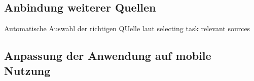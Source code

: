 \subsection{Anbindung weiterer Quellen}
	Automatische Auswahl der richtigen QUelle laut selecting task relevant sources
 \subsection{Anpassung der Anwendung auf mobile Nutzung}